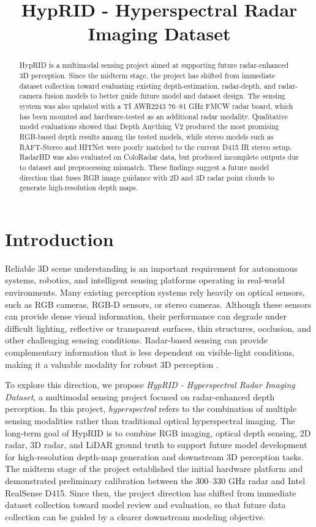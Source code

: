 \documentclass[conference]{IEEEtran}
\title{HypRID - Hyperspectral Radar Imaging Dataset}
\author{
    \IEEEauthorblockN{Steven Chen, Yung-Hsin Tsai}
    \IEEEauthorblockA{
        Department of Electrical and Computer Engineering \\
        Rice University \\
        Houston, TX, USA
    }
}
\begin{document}
\maketitle

\begin{abstract}
HypRID is a multimodal sensing project aimed at supporting future radar-enhanced 3D perception. Since the midterm stage, the project has shifted from immediate dataset collection toward evaluating existing depth-estimation, radar-depth, and radar-camera fusion models to better guide future model and dataset design. The sensing system was also updated with a TI AWR2243 76--81 GHz FMCW radar board, which has been mounted and hardware-tested as an additional radar modality. Qualitative model evaluations showed that Depth Anything V2 produced the most promising RGB-based depth results among the tested models, while stereo models such as RAFT-Stereo and HITNet were poorly matched to the current D415 IR stereo setup. RadarHD was also evaluated on ColoRadar data, but produced incomplete outputs due to dataset and preprocessing mismatch. These findings suggest a future model direction that fuses RGB image guidance with 2D and 3D radar point clouds to generate high-resolution depth maps.
\end{abstract}

\section{Introduction}

Reliable 3D scene understanding is an important requirement for autonomous systems, robotics, and intelligent sensing platforms operating in real-world environments. Many existing perception systems rely heavily on optical sensors, such as RGB cameras, RGB-D sensors, or stereo cameras. Although these sensors can provide dense visual information, their performance can degrade under difficult lighting, reflective or transparent surfaces, thin structures, occlusion, and other challenging sensing conditions. Radar-based sensing can provide complementary information that is less dependent on visible-light conditions, making it a valuable modality for robust 3D perception \cite{guan2020through}.

To explore this direction, we propose \textit{HypRID - Hyperspectral Radar Imaging Dataset}, a multimodal sensing project focused on radar-enhanced depth perception. In this project, \textit{hyperspectral} refers to the combination of multiple sensing modalities rather than traditional optical hyperspectral imaging. The long-term goal of HypRID is to combine RGB imaging, optical depth sensing, 2D radar, 3D radar, and LiDAR ground truth to support future model development for high-resolution depth-map generation and downstream 3D perception tasks. The midterm stage of the project established the initial hardware platform and demonstrated preliminary calibration between the 300--330 GHz radar and Intel RealSense D415. Since then, the project direction has shifted from immediate dataset collection toward model review and evaluation, so that future data collection can be guided by a clearer downstream modeling objective.
\end{document}
